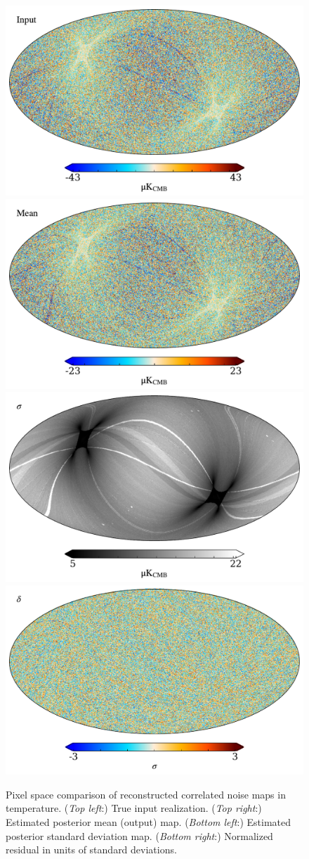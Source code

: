 \documentclass[twocolumn]{aa}%
\begin{document}
\begin{figure}[t]
    \begin{center}
      \includegraphics[width=0.49\linewidth]{figs/input_corr_map_nils.pdf}
      \includegraphics[width=0.49\linewidth]{figs/mean_corr_map_nils.pdf}\\
      \includegraphics[width=0.49\linewidth]{figs/sigma_corr_map_nils.pdf}
      \includegraphics[width=0.49\linewidth]{figs/residual_corr_map_nils.pdf}
    \end{center}
    \caption{Pixel space comparison of reconstructed correlated noise maps in temperature. (\textit{Top left}:) True input realization. (\textit{Top right}:) Estimated posterior mean (output) map.  (\textit{Bottom left}:) Estimated posterior standard deviation map. (\textit{Bottom right}:) Normalized residual in units of standard deviations.}
    \label{fig:corr_map}


\end{figure}
\end{document}
